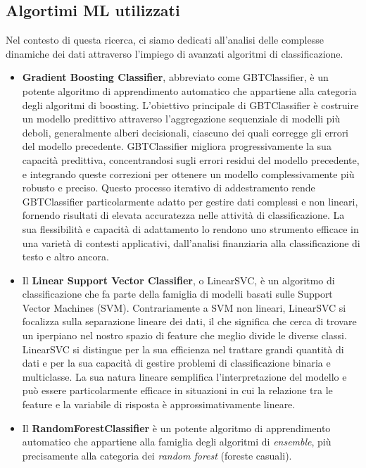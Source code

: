 \subsection[Algortimi]{Algortimi ML utilizzati}

Nel contesto di questa ricerca, ci siamo dedicati all'analisi delle complesse dinamiche dei dati attraverso l'impiego di avanzati algoritmi di classificazione.

\begin{itemize}
  \item \textbf{Gradient Boosting Classifier}, abbreviato come GBTClassifier, è un potente algoritmo di apprendimento automatico che appartiene alla categoria degli algoritmi di boosting.
  L'obiettivo principale di GBTClassifier è costruire un modello predittivo attraverso l'aggregazione sequenziale di modelli più deboli, generalmente alberi decisionali, ciascuno dei quali corregge gli errori del modello precedente.
  GBTClassifier migliora progressivamente la sua capacità predittiva, concentrandosi sugli errori residui del modello precedente, e integrando queste correzioni per ottenere un modello complessivamente più robusto e preciso.
  Questo processo iterativo di addestramento rende GBTClassifier particolarmente adatto per gestire dati complessi e non lineari, fornendo risultati di elevata accuratezza nelle attività di classificazione.
  La sua flessibilità e capacità di adattamento lo rendono uno strumento efficace in una varietà di contesti applicativi, dall'analisi finanziaria alla classificazione di testo e altro ancora.
  \item Il \textbf{Linear Support Vector Classifier}, o LinearSVC, è un algoritmo di classificazione che fa parte della famiglia di modelli basati sulle Support Vector Machines (SVM).
  Contrariamente a SVM non lineari, LinearSVC si focalizza sulla separazione lineare dei dati, il che significa che cerca di trovare un iperpiano nel nostro spazio di feature che meglio divide le diverse classi.
  LinearSVC si distingue per la sua efficienza nel trattare grandi quantità di dati e per la sua capacità di gestire problemi di classificazione binaria e multiclasse.
  La sua natura lineare semplifica l'interpretazione del modello e può essere particolarmente efficace in situazioni in cui la relazione tra le feature e la variabile di risposta è approssimativamente lineare.
  \item Il \textbf{RandomForestClassifier} è un potente algoritmo di apprendimento automatico che appartiene alla famiglia degli algoritmi di \textit{ensemble}, più precisamente alla categoria dei \textit{random forest} (foreste casuali).

\end{itemize}
